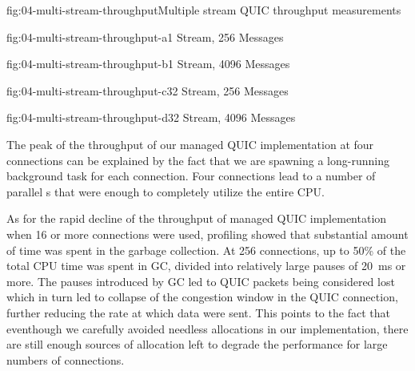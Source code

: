 \begin{myFigure}{fig:04-multi-stream-throughput}{Multiple stream QUIC throughput measurements}
\begin{mySubfigure}{0.49\linewidth}{fig:04-multi-stream-throughput-a}{1 Stream, \SI{256}{\byte} Messages}
\footnotesize

\end{mySubfigure}
\begin{mySubfigure}{0.49\linewidth}{fig:04-multi-stream-throughput-b}{1 Stream, \SI{4096}{\byte} Messages}
\footnotesize

\end{mySubfigure}

\begin{mySubfigure}{0.49\linewidth}{fig:04-multi-stream-throughput-c}{32 Stream, \SI{256}{\byte} Messages}
\footnotesize

\end{mySubfigure}
\begin{mySubfigure}{0.49\linewidth}{fig:04-multi-stream-throughput-d}{32 Stream, \SI{4096}{\byte} Messages}
\footnotesize

\end{mySubfigure}
\end{myFigure}

The peak of the throughput of our managed QUIC implementation at four connections can be explained
by the fact that we are spawning a long-running background task for each connection. Four
connections lead to a number of parallel s that were enough to completely utilize the
entire CPU\@.

As for the rapid decline of the throughput of managed QUIC implementation when 16 or more
connections were used, profiling showed that substantial amount of time was spent in the garbage
collection. At 256 connections, up to 50\% of the total CPU time was spent in GC, divided into
relatively large pauses of \SI{20}{\milli\second} or more. The pauses introduced by GC led to QUIC
packets being considered lost which in turn led to collapse of the congestion window in the QUIC
connection, further reducing the rate at which data were sent. This points to the fact that
eventhough we carefully avoided needless allocations in our implementation, there are still enough
sources of allocation left to degrade the performance for large numbers of connections.


